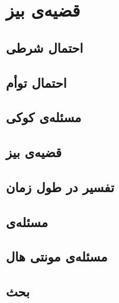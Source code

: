 \chapter{قضیه‌ی بیز}
\section{احتمال شرطی}
\section{احتمال توأم}
\section{مسئله‌ی کوکی}
\section{قضیه‌ی بیز}
\section{تفسیر در طول زمان}
\section{مسئله‌ی }
\section{مسئله‌ی مونتی هال}
\section{بحث}

